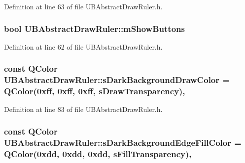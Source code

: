 Definition at line 63 of file U\-B\-Abstract\-Draw\-Ruler.\-h.

\hypertarget{class_u_b_abstract_draw_ruler_a46299ed6a2cf838fdfc9e5927a0b4d4b}{
\subsubsection[{m\-Show\-Buttons}]{\setlength{\rightskip}{0pt plus 5cm}bool U\-B\-Abstract\-Draw\-Ruler\-::m\-Show\-Buttons\hspace{0.3cm}{\ttfamily [protected]}}}\label{d0/de1/class_u_b_abstract_draw_ruler_a46299ed6a2cf838fdfc9e5927a0b4d4b}


Definition at line 62 of file U\-B\-Abstract\-Draw\-Ruler.\-h.

\hypertarget{class_u_b_abstract_draw_ruler_a45fe34ca6300be3f91ec904a97985f8a}{
\subsubsection[{s\-Dark\-Background\-Draw\-Color}]{\setlength{\rightskip}{0pt plus 5cm}const Q\-Color U\-B\-Abstract\-Draw\-Ruler\-::s\-Dark\-Background\-Draw\-Color = Q\-Color(0xff, 0xff, 0xff, s\-Draw\-Transparency)\hspace{0.3cm}{\ttfamily [static]}, {\ttfamily [protected]}}}\label{d0/de1/class_u_b_abstract_draw_ruler_a45fe34ca6300be3f91ec904a97985f8a}


Definition at line 83 of file U\-B\-Abstract\-Draw\-Ruler.\-h.

\hypertarget{class_u_b_abstract_draw_ruler_a9542dab0821f8763d97963476d8e16c5}{
\subsubsection[{s\-Dark\-Background\-Edge\-Fill\-Color}]{\setlength{\rightskip}{0pt plus 5cm}const Q\-Color U\-B\-Abstract\-Draw\-Ruler\-::s\-Dark\-Background\-Edge\-Fill\-Color = Q\-Color(0xdd, 0xdd, 0xdd, s\-Fill\-Transparency)\hspace{0.3cm}{\ttfamily [static]}, {\ttfamily [protected]}}}\label{d0/de1/class_u_b_abstract_draw_ruler_a9542dab0821f8763d97963476d8e16c5}


